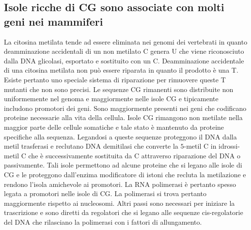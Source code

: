 \subsection{Isole ricche di CG sono associate con molti geni nei mammiferi}
La citosina metilata tende ad essere eliminata nei genomi dei vertebrati in quanto deamminazione accidentali di un non metilato C genera U che viene riconosciuto dalla DNA glicolasi, 
esportato e sostituito con un C. Deamminazione accidentale di una citosina metilata non pu\`o essere riparata in quanto il prodotto \`e una T. Esiste pertanto uno speciale sistema di
riparazione per rimuovere queste T mutanti che non sono precisi. Le sequenze CG rimanenti sono distribuite non uniformemente nel genoma e maggiormente nelle isole CG e tipicamente 
includono promotori dei geni. Sono maggiormente presenti nei geni che codificano proteine necessarie alla vita della cellula. Isole CG rimangono non metilate nella maggior parte delle
cellule somatiche e tale stato \`e mantenuto da proteine specifiche alla sequenza. Legandosi a queste sequenze proteggono il DNA dalla metil trasferasi e reclutano DNA demitilasi che
converte la $5$-metil C in idrossi-metil C che \`e successivamente sostituita da C attraverso riparazione del DNA o passivamente. Tali isole permettono ad alcune proteine che si legano
alle isole di CG e le proteggono dall'enzima modificatore di istoni che recluta la metilazione e rendono l'isola amichevole ai promotori. La RNA polimerasi \`e pertanto spesso
legata a promotori nelle isole di CG. La polimerasi si trova pertanto maggiormente rispetto ai nucleosomi. Altri passi sono necessari per iniziare la trascrizione e sono diretti da
regolatori che si legano alle sequenze cis-regolatorie del DNA che rilasciano la polimerasi con i fattori di allungamento.
